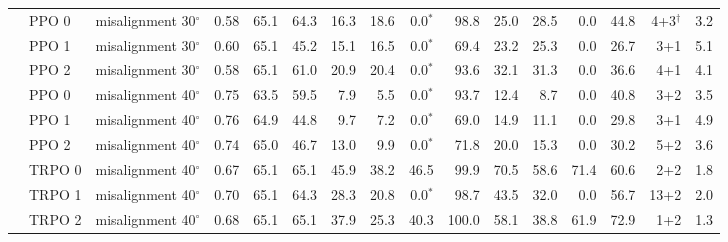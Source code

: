 \begin{tabular}{@{}lllrrrrrrrrrrrrr@{}}
 & PPO 0 & misalignment 30$^\circ$ & 0.58 & 65.1 & 64.3 & 16.3 & 18.6 & 0.0$^{*}$ & 98.8 & 25.0 & 28.5 & 0.0 & 44.8 & 4+3$^{\dagger}$ & 3.2 \\
 & PPO 1 & misalignment 30$^\circ$ & 0.60 & 65.1 & 45.2 & 15.1 & 16.5 & 0.0$^{*}$ & 69.4 & 23.2 & 25.3 & 0.0 & 26.7 & 3+1 & 5.1 \\
 & PPO 2 & misalignment 30$^\circ$ & 0.58 & 65.1 & 61.0 & 20.9 & 20.4 & 0.0$^{*}$ & 93.6 & 32.1 & 31.3 & 0.0 & 36.6 & 4+1 & 4.1 \\
 & PPO 0 & misalignment 40$^\circ$ & 0.75 & 63.5 & 59.5 & 7.9 & 5.5 & 0.0$^{*}$ & 93.7 & 12.4 & 8.7 & 0.0 & 40.8 & 3+2 & 3.5 \\
 & PPO 1 & misalignment 40$^\circ$ & 0.76 & 64.9 & 44.8 & 9.7 & 7.2 & 0.0$^{*}$ & 69.0 & 14.9 & 11.1 & 0.0 & 29.8 & 3+1 & 4.9 \\
 & PPO 2 & misalignment 40$^\circ$ & 0.74 & 65.0 & 46.7 & 13.0 & 9.9 & 0.0$^{*}$ & 71.8 & 20.0 & 15.3 & 0.0 & 30.2 & 5+2 & 3.6 \\
 & TRPO 0 & misalignment 40$^\circ$ & 0.67 & 65.1 & 65.1 & 45.9 & 38.2 & 46.5 & 99.9 & 70.5 & 58.6 & 71.4 & 60.6 & 2+2 & 1.8 \\
 & TRPO 1 & misalignment 40$^\circ$ & 0.70 & 65.1 & 64.3 & 28.3 & 20.8 & 0.0$^{*}$ & 98.7 & 43.5 & 32.0 & 0.0 & 56.7 & 13+2 & 2.0 \\
 & TRPO 2 & misalignment 40$^\circ$ & 0.68 & 65.1 & 65.1 & 37.9 & 25.3 & 40.3 & 100.0 & 58.1 & 38.8 & 61.9 & 72.9 & 1+2 & 1.3 \\
\bottomrule
\end{tabular}
